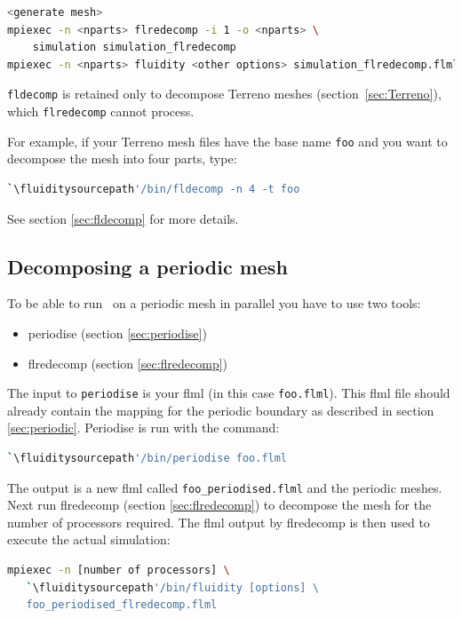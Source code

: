 \begin{lstlisting}[language=bash]
<generate mesh>
mpiexec -n <nparts> flredecomp -i 1 -o <nparts> \
    simulation simulation_flredecomp
mpiexec -n <nparts> fluidity <other options> simulation_flredecomp.flml
\end{lstlisting}

\lstinline[language=bash]+fldecomp+ is retained only to decompose Terreno meshes (section~\ref{sec:Terreno}), which \lstinline[language=bash]+flredecomp+ cannot process.

For example, if your Terreno mesh files have the base name \lstinline[language=bash]+foo+ and you want to decompose the mesh into four parts, type:
\begin{lstlisting}[language = Bash]
`\fluiditysourcepath'/bin/fldecomp -n 4 -t foo
\end{lstlisting}
See section \ref{sec:fldecomp} for more details.

\subsection{Decomposing a periodic mesh}
\label{sec:decomposing_meshes_periodise}

To be able to run \fluidity\ on a periodic mesh in parallel you have to use
two tools:

\begin{itemize}
\item periodise (section \ref{sec:periodise})
\item flredecomp (section \ref{sec:flredecomp})
\end{itemize}

The input to \lstinline+periodise+ is your flml (in this case
\lstinline{foo.flml}). This flml file should already contain the mapping for
the periodic boundary as described in section
\ref{sec:periodic}. Periodise is run with the command:

\begin{lstlisting}[language=bash]
`\fluiditysourcepath'/bin/periodise foo.flml
\end{lstlisting}

The output is a new flml called \lstinline+foo_periodised.flml+ and the
periodic meshes. Next run flredecomp (section \ref{sec:flredecomp}) to decompose the mesh for the number of processors
required. The flml output by flredecomp is then used to execute the actual simulation:

\begin{lstlisting}[language=bash]
mpiexec -n [number of processors] \
   `\fluiditysourcepath'/bin/fluidity [options] \
   foo_periodised_flredecomp.flml
\end{lstlisting}


